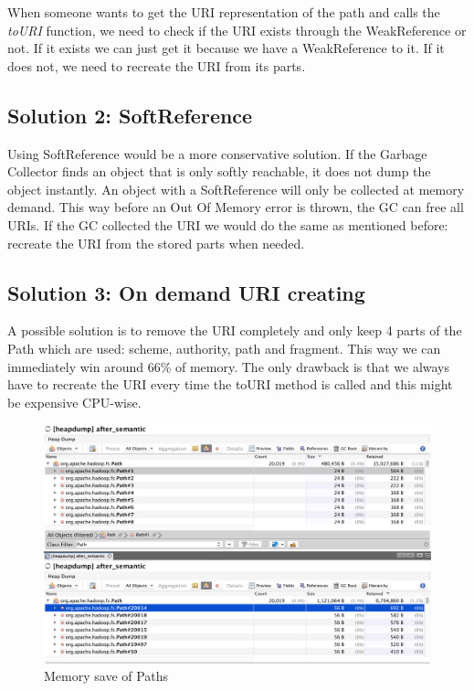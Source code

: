 When someone wants to get the URI representation of the path and calls the \textit{toURI} function, we need to check if the URI exists through the WeakReference or not. If it exists we can just get it because we have a WeakReference to it. If it does not, we need to recreate the URI from its parts. 

\subsection{Solution 2: SoftReference}
Using SoftReference would be a more conservative solution. If the Garbage Collector finds an object that is only softly reachable, it does not dump the object instantly. An object with a SoftReference will only be collected at memory demand. This way before an Out Of Memory error is thrown, the GC can free all URIs. If the GC collected the URI we would do the same as mentioned before: recreate the URI from the stored parts when needed. 

\subsection{Solution 3: On demand URI creating}
A possible solution is to remove the URI completely and only keep 4 parts of the Path which are used: scheme, authority, path and fragment. This way we can immediately win around 66\% of memory. The only drawback is that we always have to recreate the URI every time the toURI method is called and this might be expensive CPU-wise.

\begin{figure}[H]
	\includegraphics[width=150mm, keepaspectratio]{figures/path_before_after.png}
	\centering
	\caption{Memory save of Paths}
\end{figure}

